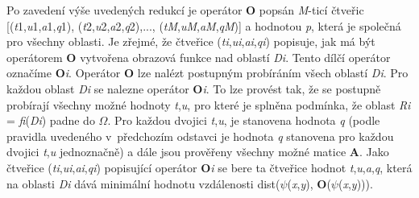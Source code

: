 \noindent 

\noindent 

\noindent Po zavedení výše uvedených redukcí je operátor \textbf{O} popsán \textit{M}-ticí čtveřic [(\textit{t}1,\textit{u}1,\textit{a}1,\textit{q}1), (\textit{t}2,\textit{u}2,\textit{a}2,\textit{q}2),...,  (\textit{tM},\textit{uM},\textit{aM},\textit{qM})] a hodnotou \textit{p}, která je společná pro všechny oblasti. Je zřejmé, že čtveřice (\textit{ti},\textit{ui},\textit{ai},\textit{qi}) popisuje, jak má být operátorem \textbf{O} vytvořena obrazová funkce nad oblastí \textit{Di}. Tento dílčí operátor označíme \textbf{O}\textit{i}. Operátor \textbf{O} lze nalézt postupným probíráním všech oblastí \textit{Di}. Pro každou oblast \textit{Di} se nalezne operátor \textbf{O}\textit{i}. To lze provést tak, že se postupně probírají všechny možné hodnoty \textit{t},\textit{u}, pro které je splněna podmínka, že oblast \textit{Ri} = \textit{fi}(\textit{Di}) padne do $\Omega$. Pro každou dvojici \textit{t},\textit{u}, je stanovena hodnota \textit{q} (podle pravidla uvedeného v~předchozím odstavci je hodnota \textit{q} stanovena pro každou dvojici \textit{t},\textit{u} jednoznačně) a dále jsou prověřeny všechny možné matice \textbf{A}. Jako čtveřice (\textit{ti},\textit{ui},\textit{ai},\textit{qi}) popisující operátor \textbf{O}\textit{i} se bere ta čtveřice hodnot \textit{t},\textit{u},\textit{a},\textit{q}, která na oblasti \textit{Di} dává minimální hodnotu vzdálenosti dist($\psi$(\textit{x},\textit{y}), \textbf{O}($\psi$(\textit{x},\textit{y}))).

